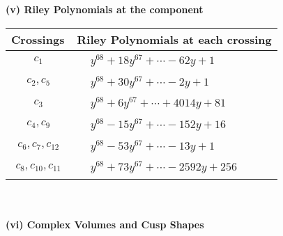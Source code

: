 \documentclass[1p]{elsarticle_modified}
\theoremstyle{definition}
\begin{document}
\newpage\renewcommand{\arraystretch}{1}
\flushleft \textbf{(v) Riley Polynomials at the component}\newline \\
\begin{tabular}{m{50pt}|m{274pt}}
Crossings & \hspace{64pt}Riley Polynomials at each crossing \\
\hline $$\begin{aligned}c_{1}\end{aligned}$$&$\begin{aligned}
&y^{68}+18 y^{67}+\cdots-62 y+1
\end{aligned}$\\
\hline $$\begin{aligned}c_{2},c_{5}\end{aligned}$$&$\begin{aligned}
&y^{68}+30 y^{67}+\cdots-2 y+1
\end{aligned}$\\
\hline $$\begin{aligned}c_{3}\end{aligned}$$&$\begin{aligned}
&y^{68}+6 y^{67}+\cdots+4014 y+81
\end{aligned}$\\
\hline $$\begin{aligned}c_{4},c_{9}\end{aligned}$$&$\begin{aligned}
&y^{68}-15 y^{67}+\cdots-152 y+16
\end{aligned}$\\
\hline $$\begin{aligned}c_{6},c_{7},c_{12}\end{aligned}$$&$\begin{aligned}
&y^{68}-53 y^{67}+\cdots-13 y+1
\end{aligned}$\\
\hline $$\begin{aligned}c_{8},c_{10},c_{11}\end{aligned}$$&$\begin{aligned}
&y^{68}+73 y^{67}+\cdots-2592 y+256
\end{aligned}$\\
\hline
\end{tabular}\\~\\
\newpage\flushleft \textbf{(vi) Complex Volumes and Cusp Shapes}
\end{document}
